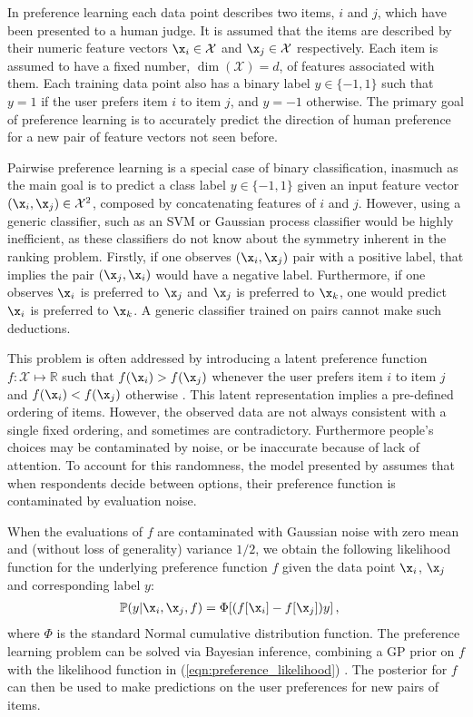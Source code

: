 In preference learning each data point describes two items, $i$ and $j$, which have been presented to a human judge. It is assumed that the items are described by their numeric feature vectors $\x_i\in\mathcal{X}$ and $\x_j\in\mathcal{X}$ respectively. Each item is assumed to have a fixed number, $\dim(\mathcal{X})=d$, of features associated with them. Each training data point also has a binary label $y\in\{-1,1\}$ such that $y=1$ if the user prefers item $i$ to item $j$, and $y=-1$ otherwise. The primary goal of preference learning is to accurately predict the direction of human preference for a new pair of feature vectors not seen before.

Pairwise preference learning is a special case of binary classification, inasmuch as the main goal is to predict a class label $y\in\{-1,1\}$ given an input feature vector $(\x_i,\x_j)\in\mathcal{X}^2$, composed by concatenating features of $i$ and $j$. However, using a generic classifier, such as an SVM or Gaussian process classifier would be highly inefficient, as these classifiers do not know about the symmetry inherent in the ranking problem. Firstly, if one observes $(\x_i,\x_j)$ pair with a positive label, that implies the pair $(\x_j,\x_i)$ would have a negative label. Furthermore, if one observes $\x_i$ is preferred to $\x_j$ and $\x_j$ is preferred to $\x_k$, one would predict $\x_i$ is preferred to $\x_k$. A generic classifier trained on pairs cannot make such deductions.

This problem is often addressed by introducing a latent preference function $f:\mathcal{X}\mapsto \mathbb{R}$ such that
$f(\x_i) > f(\x_j)$ whenever the user prefers item $i$ to item $j$ and $f(\x_i) < f(\x_j)$ otherwise \citep{Chu2005}. This latent representation implies a pre-defined ordering of items. However, the observed data are not always consistent with a single fixed ordering, and sometimes are contradictory. Furthermore people's choices may be contaminated by noise, or be inaccurate because of lack of attention. To account for this randomness, the model presented by \citet{Chu2005} assumes that when respondents decide between options, their preference function is contaminated by evaluation noise.

When the evaluations of $f$ are contaminated with Gaussian noise with zero mean and (without loss of generality) variance $1/2$, we obtain the following likelihood function for the underlying preference function $f$ given the data point $\x_i$, $\x_j$ and corresponding label $y$:
%
\begin{align}
	\mathbb{P}(y|\x_i,\x_j,f) &= \Phi[(f[\x_i] - f[\x_j])y]\,,\label{eqn:preference_likelihood}
\end{align}
%
where $\Phi$ is the standard Normal cumulative distribution function. The preference learning problem can be solved via Bayesian inference, combining a GP prior on $f$ with the likelihood function in (\ref{eqn:preference_likelihood}) \citep{Chu2005}. The posterior for $f$ can then be used to make predictions on the user preferences for new pairs of items.


